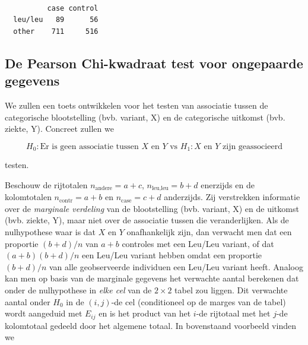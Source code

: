 \documentclass[
  dutch,
  letterpaper,
  12pt]{book}
\theoremstyle{definition}
\theoremstyle{definition}
\theoremstyle{definition}
\theoremstyle{remark}
\begin{document}
\begin{verbatim}
         
          case control
  leu/leu   89      56
  other    711     516
\end{verbatim}

\begin{table}

\caption{\label{tbl-leu4}}


\end{table}%

\subsection{De Pearson Chi-kwadraat test voor ongepaarde
gegevens}\label{de-pearson-chi-kwadraat-test-voor-ongepaarde-gegevens}

We zullen een toets ontwikkelen voor het testen van associatie tussen de
categorische blootstelling (bvb. variant, X) en de categorische uitkomst
(bvb. ziekte, Y). Concreet zullen we

\[H_0: \text{Er is geen associatie tussen } X \text{ en } Y \text{ vs } H_1: X \text{ en } Y \text{ zijn geassocieerd}\]

testen.

Beschouw de rijtotalen \(n_\text{andere}=a+c\), \(n_\text{leu,leu}=b+d\)
enerzijds en de kolomtotalen \(n_\text{contr}=a+b\) en
\(n_\text{case}=c+d\) anderzijds. Zij verstrekken informatie over de
\emph{marginale verdeling} van de blootstelling (bvb. variant, X) en de
uitkomst (bvb. ziekte, Y), maar niet over de associatie tussen die
veranderlijken. Als de nulhypothese waar is dat \(X\) en \(Y\)
onafhankelijk zijn, dan verwacht men dat een proportie \((b+d)/n\) van
\(a+b\) controles met een Leu/Leu variant, of dat \((a+b)(b+d)/n\) een
Leu/Leu variant hebben omdat een proportie \((b+d)/n\) van alle
geobserveerde individuen een Leu/Leu variant heeft. Analoog kan men op
basis van de marginale gegevens het verwachte aantal berekenen dat onder
de nulhypothese in \emph{elke cel} van de \(2\times 2\) tabel zou
liggen. Dit verwachte aantal onder \(H_0\) in de \((i,j)\)-de cel
(conditioneel op de marges van de tabel) wordt aangeduid met \(E_{ij}\)
en is het product van het \(i\)-de rijtotaal met het \(j\)-de
kolomtotaal gedeeld door het algemene totaal. In bovenstaand voorbeeld
vinden we
\end{document}
